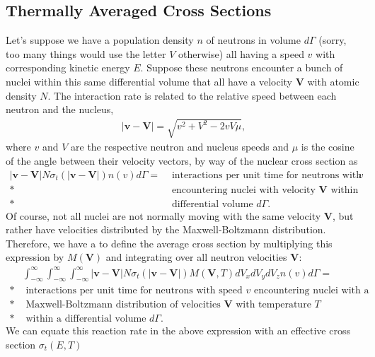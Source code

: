 \subsection{Thermally Averaged Cross Sections}

Let's suppose we have a population density $n$ of neutrons in volume $d\Gamma$ (sorry, too many things would use the letter $V$ otherwise) all having a speed $v$ with corresponding kinetic energy $E$. Suppose these neutrons encounter a bunch of nuclei within this same differential volume that all have a velocity $\mathbf{V}$ with atomic density $N$. The interaction rate is related to the relative speed between each neutron and the nucleus,
\begin{align}
  | \mathbf{v} - \mathbf{V} | = \sqrt{ v^2 + V^2 - 2 v V \mu } ,
\end{align}
where $v$ and $V$ are the respective neutron and nucleus speeds and $\mu$ is the cosine of the angle between their velocity vectors, by way of the nuclear cross section as
\begin{align}
  | \mathbf{v} - \mathbf{V} | N \sigma_t( | \mathbf{v} - \mathbf{V} | ) n( v ) d\Gamma = 
  &\text{ interactions per unit time for neutrons with speed $v$ } \nonumber \\*
  &\text{ encountering nuclei with velocity $\mathbf{V}$ within  } \nonumber \\*
  &\text{ differential volume $d\Gamma$.} \nonumber
\end{align}
Of course, not all nuclei are not normally moving with the same velocity $\mathbf{V}$, but rather have velocities distributed by the Maxwell-Boltzmann distribution. Therefore, we have a to define the average cross section by multiplying this expression by $M(\mathbf{V})$ and integrating over all neutron velocities $\mathbf{V}$:
\begin{align}
  &\int_{-\infty}^\infty \int_{-\infty}^\infty  \int_{-\infty}^\infty | \mathbf{v} - \mathbf{V} | N \sigma_t( | \mathbf{v} - \mathbf{V} | )  M(\mathbf{V},T) dV_x dV_y dV_z n( v ) d\Gamma = \nonumber \\*
  &\text{ interactions per unit time for neutrons with speed $v$ encountering nuclei with a } \nonumber \\*
  &\text{ Maxwell-Boltzmann distribution of velocities $\mathbf{V}$ with temperature $T$  } \nonumber \\*
  &\text{ within a differential volume $d\Gamma$.} \nonumber 
\end{align}
We can equate this reaction rate in the above expression with an effective cross section $\sigma_t(E,T)$ 
